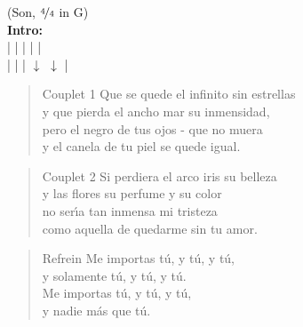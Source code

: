 (Son, $\nicefrac{4}{4}$ in G)\\

\textbf{Intro:}\\
| \hspace{1em} \hspace{1em} | \hspace{1em} \hspace{1em} | \hspace{1em} \hspace{1em} | \hspace{1em} \hspace{1em} |
\\
| \hspace{1em} \hspace{1em} | \hspace{1em} \hspace{1em} | $\downarrow$\hspace{1em} $\downarrow$\hspace{1.55em} |

\begin{verse}{Couplet 1}
  Que se quede el infinito sin estrellas\hspace{3em}
  \\
  y que pierda el ancho mar su inmensidad,
  \\
  pero el negro de tus ojos - que no muera
  \\
  y el canela de tu piel se quede igual.
\end{verse}

\begin{verse}{Couplet 2}
  Si perdiera el arco iris su belleza\hspace{3em}
  \\
  y las flores su perfume y su color
  \\
  no ser\'{\i}a tan inmensa mi tristeza
  \\
  como aquella de quedarme sin tu amor.
\end{verse}

\begin{verse}{Refrein}
  Me importas t\'{u}, y t\'{u}, y t\'{u},
  \\
  y solamente t\'{u}, y t\'{u}, y t\'{u}.
  \\
  Me importas t\'{u}, y t\'{u}, y t\'{u},
  \\
  y nadie m\'{a}s que t\'{u}.
\end{verse}

